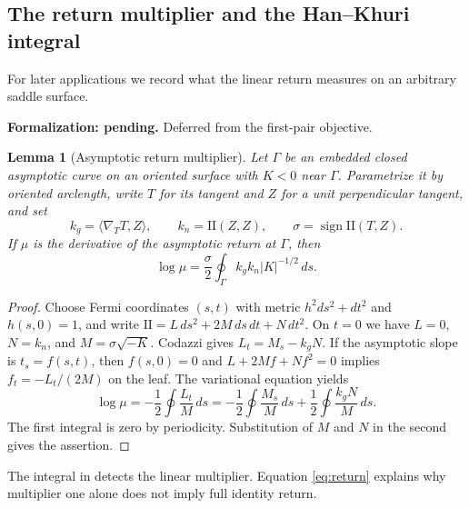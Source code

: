 \documentclass[11pt]{amsart}
\newtheorem{lemma}[theorem]{Lemma}
\theoremstyle{definition}
\theoremstyle{remark}
\newcommand{\II}{\mathrm{II}}\newcommand{\Gmap}{\mathcal G}
\numberwithin{equation}{section}
\begin{document}
\subsection{The return multiplier and the Han--Khuri integral}
For later applications we record what the linear return measures on an
arbitrary saddle surface.
\par\noindent\textbf{Formalization: pending.} Deferred from the first-pair objective.\par
\begin{lemma}[Asymptotic return multiplier]\label{lem:holonomy-integral-new}
Let $\Gamma$ be an embedded closed asymptotic curve on an oriented
surface with $K<0$ near $\Gamma$. Parametrize it by oriented arclength,
write $T$ for its tangent and $Z$ for a unit perpendicular tangent, and set
\[
 k_g=\langle\nabla_TT,Z\rangle,\qquad k_n=\II(Z,Z),\qquad
 \sigma=\operatorname{sign}\II(T,Z).
\]
If $\mu$ is the derivative of the asymptotic return at $\Gamma$, then
\begin{equation}\label{eq:holonomy-integral-new}
 \log\mu=\frac\sigma2\oint_\Gamma k_gk_n|K|^{-1/2}\,ds.
\end{equation}
\end{lemma}
\begin{proof}
Choose Fermi coordinates $(s,t)$ with metric $h^2ds^2+dt^2$ and
$h(s,0)=1$, and write $\II=L\,ds^2+2M\,ds\,dt+N\,dt^2$.
On $t=0$ we have $L=0$, $N=k_n$, and $M=\sigma\sqrt{-K}$.
Codazzi gives $L_t=M_s-k_gN$. If the asymptotic slope is $t_s=f(s,t)$,
then $f(s,0)=0$ and $L+2Mf+Nf^2=0$ implies $f_t=-L_t/(2M)$ on the
leaf. The variational equation yields
\[
 \log\mu=-\frac12\oint\frac{L_t}{M}\,ds
 =-\frac12\oint\frac{M_s}{M}\,ds+
   \frac12\oint\frac{k_gN}{M}\,ds.
\]
The first integral is zero by periodicity. Substitution of $M$ and $N$
in the second gives the assertion.
\end{proof}
The integral in \cite{HK} detects the linear multiplier. Equation
\eqref{eq:return} explains why multiplier one alone does not imply full
identity return.
\end{document}
